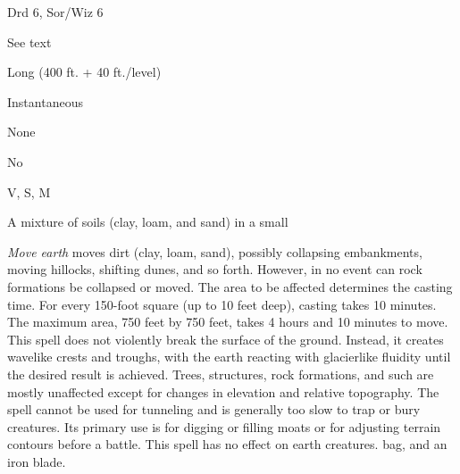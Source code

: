 
\begin{description*}
\item[Level:] Drd 6, Sor/Wiz 6
\item[Casting Time:] See text
\item[Range:] Long (400 ft. + 40 ft./level)
\item[Duration:] Instantaneous
\item[Saving Throw:] None
\item[Spell Resistance:] No
\item[Components:] V, S, M
\item[Arcane Material Component:] A mixture of soils (clay, loam, and sand) in a small
\end{description*}

\textit{Move earth} moves dirt (clay, loam, sand), possibly collapsing embankments,
moving hillocks, shifting dunes, and so forth.
However, in no event can rock formations be collapsed or moved. The area to be
affected determines the casting time. For every 150-foot square (up to 10 feet
deep), casting takes 10 minutes. The maximum area, 750 feet by 750 feet, takes
4 hours and 10 minutes to move.
This spell does not violently break the surface of the ground. Instead, it creates
wavelike crests and troughs, with the earth reacting with glacierlike fluidity
until the desired result is achieved. Trees, structures, rock formations, and such
are mostly unaffected except for changes in elevation and relative topography.
The spell cannot be used for tunneling and is generally too slow to trap or bury
creatures. Its primary use is for digging or filling moats or for adjusting terrain
contours before a battle.
This spell has no effect on earth creatures.
bag, and an iron blade.